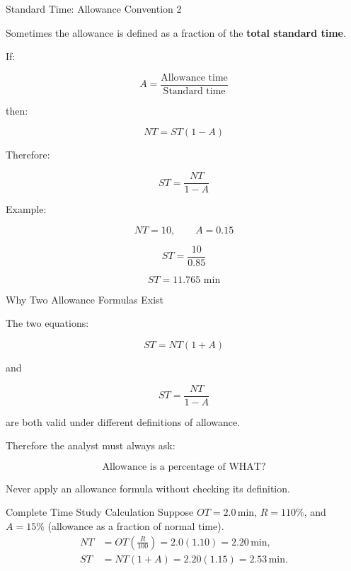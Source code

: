 \documentclass[aspectratio=169,10pt]{beamer}
\begin{document}

\begin{frame}[shrink=18]{Standard Time: Allowance Convention 2}
\small

Sometimes the allowance is defined as a fraction of the
\textbf{total standard time}.

If:

\[
A=
\frac{\text{Allowance time}}{\text{Standard time}}
\]

then:

\[
NT=ST(1-A)
\]

Therefore:

\[
\boxed{
ST=\frac{NT}{1-A}
}
\]

Example:

\[
NT=10,\qquad A=0.15
\]

\[
ST=\frac{10}{0.85}
\]

\[
\boxed{
ST=11.765\text{ min}
}
\]

\end{frame}


\begin{frame}[shrink=18]{Why Two Allowance Formulas Exist}
\small

The two equations:

\[
ST=NT(1+A)
\]

and

\[
ST=\frac{NT}{1-A}
\]

are both valid under different definitions of allowance.

\vspace{6pt}

Therefore the analyst must always ask:

\[
\boxed{
\text{Allowance is a percentage of WHAT?}
}
\]

\vspace{5pt}

Never apply an allowance formula without checking its definition.

\end{frame}


\begin{frame}{Complete Time Study Calculation}
\small
Suppose $OT=2.0\,\mathrm{min}$, $R=110\%$, and $A=15\%$ (allowance as a fraction of normal time).
\vspace{2pt}
\begin{align*}
NT&=OT\left(\frac{R}{100}\right)=2.0(1.10)=2.20\,\mathrm{min},\\
ST&=NT(1+A)=2.20(1.15)=2.53\,\mathrm{min}.
\end{align*}
\begin{center}
\qquad
{}
\end{center}
\end{frame}
\end{document}
